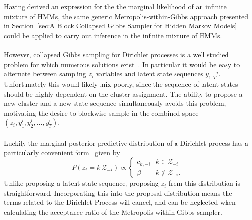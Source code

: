 \documentclass[12pt]{report}
\newcommand{\1}[0]{\mathbbm{1}}
\newcommand{\seq}[3]{\ensuremath{#1_{{#2}:{#3}}}}
\begin{document}
Having derived an expression for the the marginal likelihood of an infinite
mixture of \acp{HMM}, the same generic Metropolis-within-Gibbs approach presented
in Section~\ref{sec:A Block Collapsed Gibbs Sampler for Hidden Markov Models}
could be applied to carry out inference in the infinite mixture of \acp{HMM}.
\\\\
However, collapsed Gibbs sampling for Dirichlet processes is a well studied problem for
which numerous solutions exist~\cite{neal-mcmc-dp}. In particular it would be easy
to alternate between sampling $z_i$ variables and latent state sequences $\seq{y}{1}{T}^i$.
Unfortunately this would likely mix poorly, since the sequence of latent states should be highly
dependent on the cluster assignment. The ability to propose a new cluster and a new state sequence
simultaneously avoids this problem, motivating the desire to blockwise sample
in the combined space $(z_i, y^i_1, y^i_2, \ldots, y^i_T)$.
\\\\
Luckily the marginal posterior predictive distribution of a Dirichlet process has a particularly
convenient form~\cite{infinite-gmm} given by
\[
    P(z_i=k|\mathcal{Z}_{-i}) \propto
    \begin{cases}
        c_{k,-i} & k \in \mathcal{Z}_{-i} \\
        \beta   & k \not\in \mathcal{Z}_{-i}.
    \end{cases}
\]
Unlike proposing a latent state sequence, proposing $z_i$ from this distribution is straightforward.
Incorporating this into the proposal distribution means the terms related to the Dirichlet Process
will cancel, and can be neglected when calculating the acceptance ratio of the Metropolis within Gibbs sampler.
\end{document}
